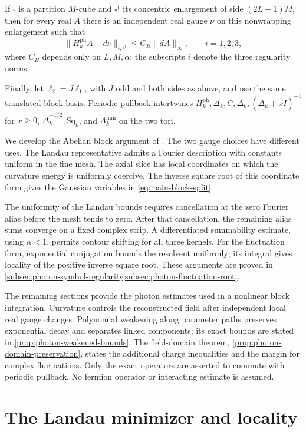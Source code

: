 \begin{theorem}
If \(\square\) is a partition \(M\)-cube and
\(\square^\dagger\) its concentric enlargement of side
\((2L+1)M\), then for every real \(A\) there is an independent
real gauge \(\nu\) on this nonwrapping enlargement such that
\[
 \|H_k^{\mathrm{ph}}A-d\nu\|_{i,\square^\dagger}
       \le C_B\|dA\|_\infty,\qquad i=1,2,3,
\]
where \(C_B\) depends only on \(L,M,\alpha\); the subscripts
\(i\) denote the three regularity norms.

Finally, let \(\ell_2=J\ell_1\), with \(J\) odd and both sides
as above, and use the same translated block basis. Periodic
pullback intertwines \(H_k^{\mathrm{ph}},\Delta_k,C,
\widetilde\Delta_k,(\widetilde\Delta_k+xI)^{-1}\) for \(x\ge0\),
\(\widetilde\Delta_k^{-1/2},\mathrm{Sq}_k\), and
\(A_k^{\min}\) on the two tori.
\end{theorem}

We develop the Abelian block argument of
\cite[Section~10]{QED3Manuscript}. The two gauge choices have
different uses. The Landau representative admits a Fourier
description with constants uniform in the fine mesh. The axial
slice has local coordinates on which the curvature energy is
uniformly coercive. The inverse square root of this coordinate
form gives the Gaussian variables in \eqref{eq:main-block-split}.

The uniformity of the Landau bounds requires cancellation at the
zero Fourier alias before the mesh tends to zero. After that
cancellation, the remaining alias sums converge on a fixed complex
strip. A differentiated summability estimate, using \(\alpha<1\),
permits contour shifting for all three kernels. For the
fluctuation form, exponential conjugation bounds the resolvent
uniformly; its integral gives locality of the positive inverse
square root. These arguments are proved in
\cref{subsec:photon-symbol-regularity,subsec:photon-fluctuation-root}.

The remaining sections provide the photon estimates used in a
nonlinear block integration. Curvature controls the reconstructed
field after independent local real gauge changes. Polynomial
weakening along parameter paths preserves exponential decay and
separates linked components; its exact bounds are stated in
\cref{prop:photon-weakened-bounds}. The field-domain theorem,
\cref{prop:photon-domain-preservation}, states the additional
charge inequalities and the margin for complex fluctuations.
Only the exact operators are asserted to commute with periodic
pullback. No fermion operator or interacting estimate is assumed.
\section{The Landau minimizer and locality}\label{sec:photon-primitives}
